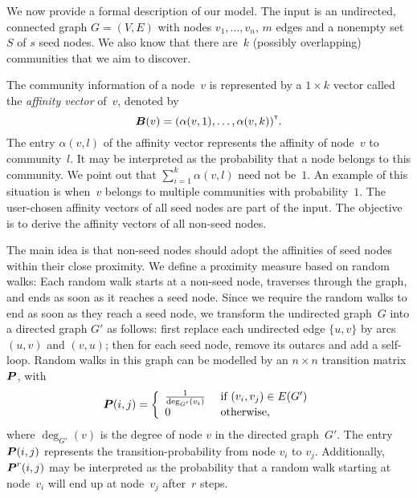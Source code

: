 We now provide a formal description of our model.  The input is an undirected,
connected graph $G = (V,E)$ with nodes $v_1, \ldots, v_n$, $m$ edges and a
nonempty set $S$ of $s$ seed nodes. We also know that there are~$k$ (possibly
overlapping) communities that we aim to discover.

The community information of a node~$v$ is represented 
by a $1 \times k$ vector called the \emph{affinity vector} of~$v$, denoted 
by 
\[
	\boldsymbol{B} (v) = {\left ( \alpha (v, 1), \ldots, \alpha (v, k) \right )}^{\scriptscriptstyle \mathsf{T}}.
\] 
The entry $\alpha (v, l)$ of the affinity vector represents the affinity of
node~$v$ to community~$l$.  It may be interpreted as the probability that a node
belongs to this community.  We point out that $\sum_{i = 1}^k \alpha (v, l)$
need not be~$1$.  An example of this situation is when~$v$ belongs to multiple
communities with probability~$1$.  The user-chosen affinity vectors of all seed
nodes are part of the input.  The objective is to derive the affinity vectors of
all non-seed nodes. 

The main idea is that non-seed nodes should adopt the
affinities of seed nodes within their close proximity. We define a proximity
measure based on random walks: Each random walk starts at a non-seed node,
traverses through the graph, and ends as soon as it reaches a seed node. 
Since we require the random walks to end as soon as they reach a seed node, we transform 
the undirected graph~$G$ into a directed graph $G'$ as follows: first replace each undirected 
edge $\{u, v\}$ by arcs $(u, v)$ and $(v, u)$; then for each seed node, remove its 
outarcs and add a self-loop. 
Random walks in this graph can be modelled by an $n \times n$ transition matrix $\boldsymbol{P}$, with
\begin{equation}\label{eqn:defining_prob}
	\boldsymbol{P}(i, j) = \left \{ 
							\begin{array}{ll}
                                \frac{1}{\deg_{G'} (v_i)} & \mbox{ if } (v_i, v_j) \in E(G') \\
								0			& \mbox{ otherwise,}
							\end{array}
					\right.
\end{equation}
where $\deg_{G'} (v)$ is the degree of node $v$ in the directed graph~$G'$.
The entry $\boldsymbol{P}(i, j)$ represents the transition-probability from node $v_i$ to $v_j$.
Additionally, $\boldsymbol{P}^r (i, j)$ may be interpreted as the probability that a random 
walk starting at node~$v_i$ will end up at node~$v_j$ after~$r$ steps. 

